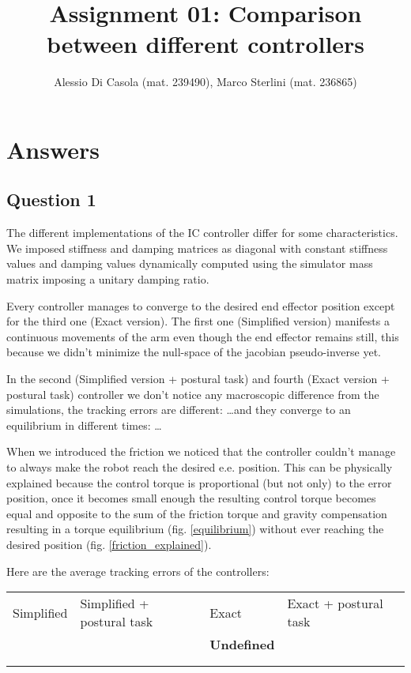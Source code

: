 \documentclass[10pt]{article}
\begin{document}
\date{}
\author{Alessio Di Casola (mat. 239490), Marco Sterlini (mat. 236865)}

\title{Assignment 01: Comparison between different controllers}

\maketitle

\section{Answers}
\subsection{Question 1}
The different implementations of the IC controller differ for some characteristics.
We imposed stiffness and damping matrices as diagonal with constant stiffness values and damping values dynamically computed using the simulator mass matrix imposing a unitary damping ratio. 

Every controller manages to converge to the desired end effector position except for the third one (Exact version). The first one (Simplified version) manifests a continuous movements of the arm even though the end effector remains still, this because we didn't minimize the null-space of the jacobian pseudo-inverse yet.

In the second (Simplified version + postural task) and fourth (Exact version + postural task) controller we don't notice any macroscopic difference from the simulations, the tracking errors are different: \dots and they converge to an equilibrium in different times: \dots

When we introduced the friction we noticed that the controller couldn't manage to always make the robot reach the desired e.e. position. This can be physically explained because the control torque is proportional (but not only) to the error position, once it becomes small enough the resulting control torque becomes equal and opposite to the sum of the friction torque and gravity compensation resulting in a torque equilibrium (fig. \ref{equilibrium}) without ever reaching the desired position (fig. \ref{friction_explained}).

Here are the average tracking errors of the controllers:

\begin{table}[h]
    \begin{tabular}{lllll}
    \cline{1-4}
    \multicolumn{1}{|l|}{Simplified} & \multicolumn{1}{l|}{Simplified + postural task} & \multicolumn{1}{l|}{Exact} & \multicolumn{1}{l|}{Exact + postural task} &  \\ \cline{1-4}
    \multicolumn{1}{|l|}{} & \multicolumn{1}{l|}{} & \multicolumn{1}{l|}{\textbf{Undefined}} & \multicolumn{1}{l|}{} &  \\ \cline{1-4}
                           &                       &                       &                       &  \\
                           &                       &                       &                       & 
    \end{tabular}
\end{table}
\end{document}
